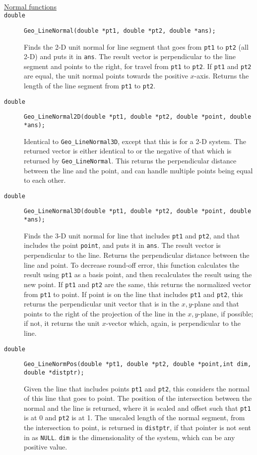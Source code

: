 \documentclass[11pt]{article}
\newcommand {\ttt} {\texttt}
\begin{document}
\begin{description}
\hfill \\
\item[\underline{Normal functions}]

\item[\ttt{double}]
\ttt{Geo\_LineNormal(double *pt1, double *pt2, double *ans);}

Finds the 2-D unit normal for line segment that goes from \ttt{pt1} to \ttt{pt2} (all 2-D) and puts it in \ttt{ans}. The result vector is perpendicular to the line segment and points to the right, for travel from \ttt{pt1} to \ttt{pt2}. If \ttt{pt1} and \ttt{pt2} are equal, the unit normal points towards the positive $x$-axis. Returns the length of the line segment from \ttt{pt1} to \ttt{pt2}.

\item[\ttt{double}]
\ttt{Geo\_LineNormal2D(double *pt1, double *pt2, double *point, double *ans);}

Identical to \ttt{Geo\_LineNormal3D}, except that this is for a 2-D system. The returned vector is either identical to or the negative of that which is returned by \ttt{Geo\_LineNormal}. This returns the perpendicular distance between the line and the point, and can handle multiple points being equal to each other.

\item[\ttt{double}]
\ttt{Geo\_LineNormal3D(double *pt1, double *pt2, double *point, double *ans);}

Finds the 3-D unit normal for line that includes \ttt{pt1} and \ttt{pt2}, and that includes the point \ttt{point}, and puts it in \ttt{ans}. The result vector is perpendicular to the line. Returns the perpendicular distance between the line and point. To decrease round-off error, this function calculates the result using \ttt{pt1} as a basis point, and then recalculates the result using the new point. If \ttt{pt1} and \ttt{pt2} are the same, this returns the normalized vector from \ttt{pt1} to point. If point is on the line that includes \ttt{pt1} and \ttt{pt2}, this returns the perpendicular unit vector that is in the $x,y$-plane and that points to the right of the projection of the line in the $x,y$-plane, if possible; if not, it returns the unit $x$-vector which, again, is perpendicular to the line.

\item[\ttt{double}]
\ttt{Geo\_LineNormPos(double *pt1, double *pt2, double *point,int dim, double *distptr);}

Given the line that includes points \ttt{pt1} and \ttt{pt2}, this considers the normal of this line that goes to point. The position of the intersection between the normal and the line is returned, where it is scaled and offset such that \ttt{pt1} is at 0 and \ttt{pt2} is at 1. The unscaled length of the normal segment, from the intersection to point, is returned in \ttt{distptr}, if that pointer is not sent in as \ttt{NULL}. \ttt{dim} is the dimensionality of the system, which can be any positive value.


\end{description}
\end{document}
